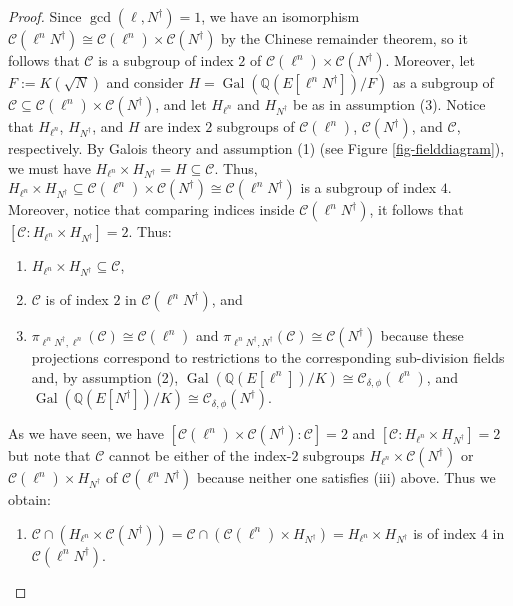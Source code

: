\documentclass[11pt]{amsart}
\theoremstyle{definition}
\newcommand{\Q}{\mathbb{Q}}
\newcommand{\cC}{\mathcal{C}}
\newcommand{\Gal}{\operatorname{Gal}}
\begin{document}
\begin{proof}
Since $\gcd(\ell,N^\dagger)=1$, we have an isomorphism $\cC(\ell^n N^\dagger)\cong \cC(\ell^n)\times \cC(N^\dagger)$ by the Chinese remainder theorem, so it follows that $\cC$ is a subgroup of index $2$ of $\cC(\ell^n)\times \cC(N^\dagger)$. Moreover, let $F := K(\sqrt{N})$ and consider $H = \Gal(\Q(E[\ell^n N^\dagger])/F)$ as a subgroup of $\cC \subseteq \cC(\ell^n)\times \cC(N^\dagger)$, and let $H_{\ell^n}$ and $H_{N^\dagger}$ be as in assumption (3). Notice that $H_{\ell^n}$, $H_{N^\dagger}$, and $H$ are index $2$ subgroups of $\cC(\ell^n)$, $\cC(N^\dagger)$, and $\cC$, respectively. By Galois theory and assumption (1) (see Figure \ref{fig-fielddiagram}), we must have $H_{\ell^n}\times H_{N^\dagger} = H \subseteq \cC$. Thus, $H_{\ell^n} \times H_{N^\dagger} \subseteq \cC(\ell^n)\times \cC(N^\dagger)\cong \cC(\ell^n N^\dagger)$ is a subgroup of index $4$. Moreover, notice that comparing indices inside $\cC(\ell^n N^\dagger)$, it follows that $[\cC: H_{\ell^n}\times H_{N^\dagger}]=2$. Thus:
\begin{enumerate}
    \item[(i)] $H_{\ell^n} \times H_{N^\dagger} \subseteq \cC$,
    \item[(ii)] $\cC$ is of index $2$ in $\cC(\ell^n N^\dagger)$, and
    \item[(iii)] $\pi_{\ell^n N^\dagger, \ell^n}(\cC)\cong \cC(\ell^n)$ and $\pi_{\ell^n N^\dagger, N^\dagger}(\cC)\cong \cC(N^\dagger)$ because these projections correspond to restrictions to the corresponding sub-division fields and, by assumption (2), $\Gal(\Q(E[\ell^n])/K)\cong \cC_{\delta,\phi}(\ell^n)$, and  $\Gal(\Q(E[N^\dagger])/K)\cong \cC_{\delta,\phi}(N^\dagger)$.
\end{enumerate}
As we have seen, we have $[\cC(\ell^n)\times \cC(N^\dagger):\cC]=2$ and $[\cC: H_{\ell^n}\times H_{N^\dagger}]=2$ but note that $\cC$ cannot be either of the index-$2$ subgroups $H_{\ell^n}\times \cC(N^\dagger)$ or  $ \cC(\ell^n) \times H_{N^\dagger}$ of $\cC(\ell^n N^\dagger)$ because neither one satisfies (iii) above. Thus we obtain:
\begin{enumerate} 
    \item[(iv)] $\cC \cap (H_{\ell^n}\times \cC(N^\dagger)) = \cC \cap (\cC(\ell^n) \times H_{N^\dagger})=H_{\ell^n}\times H_{N^\dagger}$ is of index $4$ in $\cC(\ell^n N^\dagger)$.
\end{enumerate}


\end{proof}
\end{document}
